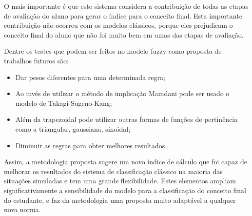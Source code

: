 \documentclass{article}
\begin{document}
O mais importante é que este sistema considera a contribuição
de todas as etapas de avaliação do aluno para gerar o índice
para o conceito final. Esta importante contribuição não
ocorreu com os modelos clássicos, porque eles prejudicam o
conceito final do aluno que não foi muito bem em umas das
etapas de avaliação.


Dentre os testes que podem ser feitos no modelo fuzzy como
proposta de trabalhos futuros são: 

\begin{itemize}
    \item Dar pesos diferentes para uma determinada regra;
    \item Ao invés de utilizar o método de implicação
Mamdani pode ser usado o modelo de Takagi-Sugeno-Kang;
    \item Além da trapezoidal pode utilizar outras formas de
    funções de pertinência como a triangular, gaussiana,
    sinoidal;
    \item Diminuir as regras para obter melhores resultados.
\end{itemize}

Assim, a metodologia proposta sugere um novo índice de
cálculo que foi capaz de melhorar os resultados do sistema
de classificação clássico na maioria das situações
simuladas e tem uma grande flexibilidade. Estes elementos
ampliam significativamente a sensibilidade do modelo para
a classificação do conceito final do estudante, e faz da
metodologia uma proposta muito adaptável a qualquer nova norma.
	




\end{document}
